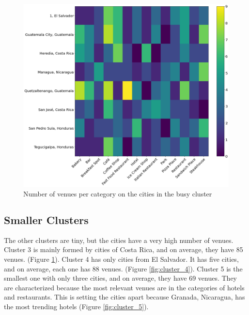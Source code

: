 \documentclass[letterpaper,12pt]{article}
\begin{document}
\begin{figure}[h]
    \centering
    \includegraphics[width=\textwidth]{images/cluster3.png}
    \caption{Number of venues per category on the cities in the busy cluster}
    \label{fig:cluster_3}
\end{figure}


\subsection{Smaller Clusters}

The other clusters are tiny, but the cities have a very high number of venues. Cluster 3 is mainly formed by cities of Costa Rica, and on average, they have 85 venues. (Figure \ref{fig:cluster_3}). Cluster 4 has only cities from El Salvador. It has five cities, and on average, each one has 88 venues. (Figure \ref{fig:cluster_4}). Cluster 5 is the smallest one with only three cities, and on average, they have 69 venues. They are characterized because the most relevant venues are in the categories of hotels and restaurants. This is setting the cities apart because Granada, Nicaragua, has the most trending hotels (Figure \ref{fig:cluster_5}).
\end{document}
